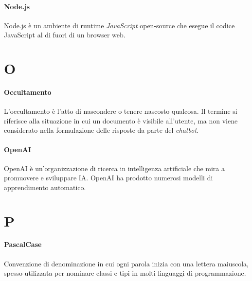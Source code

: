 \documentclass[10pt, a4paper]{article}
\begin{document}
\paragraph{Node.js}\noindent\hrulefill
\paragraph{}Node.js è un ambiente di runtime \textit{JavaScript\pg} open-source che esegue il codice JavaScript al di fuori di un browser web.


\newpage
\section{O}

\vspace{2em}
\paragraph{Occultamento}\noindent\hrulefill
\paragraph{}L’occultamento è l’atto di nascondere o tenere nascosto qualcosa. Il termine si riferisce alla situazione in cui un documento è visibile all’utente, ma non viene considerato nella formulazione delle risposte da parte del \textit{chatbot\pg}.

\vspace{2em}
\paragraph{OpenAI}\noindent\hrulefill
\paragraph{}OpenAI è un'organizzazione di ricerca in intelligenza artificiale che mira a promuovere e sviluppare IA. OpenAI ha prodotto numerosi modelli di apprendimento automatico.

\newpage
\section{P}

\vspace{2em}
\paragraph{PascalCase}\noindent\hrulefill
\paragraph{}Convenzione di denominazione in cui ogni parola inizia con una lettera maiuscola, spesso utilizzata per nominare classi e tipi in molti linguaggi di programmazione.
\end{document}
